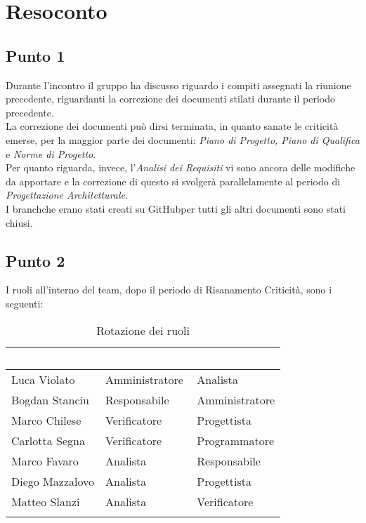 \section{Resoconto}

\subsection{Punto 1}
Durante l'incontro il gruppo ha discusso riguardo i compiti assegnati la riunione precedente, riguardanti la correzione dei documenti stilati durante il periodo precedente. \\
La correzione dei documenti può dirsi terminata, in quanto sanate le criticità emerse, per la maggior parte dei documenti: \textit{Piano di Progetto, Piano di Qualifica} e \textit{Norme di Progetto}. \\
Per quanto riguarda, invece, l'\textit{Analisi dei Requisiti} vi sono ancora delle modifiche da apportare e la correzione di questo si svolgerà parallelamente al periodo di \textit{Progettazione Architetturale}. \\
I branch\glossario che erano stati creati su GitHub\glossario per tutti gli altri documenti sono stati chiusi. \\


\subsection{Punto 2}
I ruoli all'interno del team, dopo il periodo di Risanamento Criticità, sono i seguenti:\\

\begin{center}
\begin{longtable}[c]{|m{}|m{}|m{}|} 
\hline
\rowcolor{bluelogo}\textbf{\textcolor{white}{Membro}} & \textbf{\textcolor{white}{Vecchio Ruolo}} & \textbf{\textcolor{white}{Nuovo Ruolo}}\\
\hline
\hline
Luca Violato & Amministratore & Analista \\
\hline
\rowcolor{grigio}Bogdan Stanciu & Responsabile & Amministratore \\
\hline
Marco Chilese & Verificatore & Progettista\\
\hline
\rowcolor{grigio}Carlotta Segna & Verificatore & Programmatore\\
\hline
Marco Favaro & Analista & Responsabile \\
\hline
\rowcolor{grigio} Diego Mazzalovo & Analista & Progettista\\
\hline
Matteo Slanzi & Analista & Verificatore\\
\hline
\caption{Rotazione dei ruoli}
\end{longtable}
\end{center}

